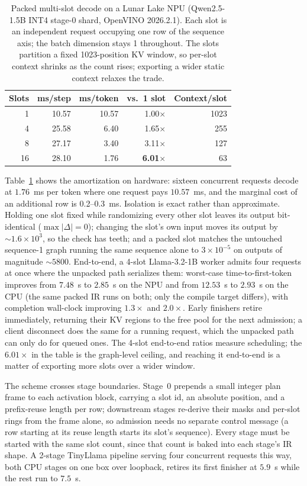 \documentclass[11pt]{article}
\begin{document}
\begin{table}[ht]
\centering
\caption{Packed multi-slot decode on a Lunar Lake NPU (Qwen2.5-1.5B INT4 stage-0 shard, OpenVINO 2026.2.1). Each slot is an independent request occupying one row of the sequence axis; the batch dimension stays 1 throughout. The slots partition a fixed 1023-position KV window, so per-slot context shrinks as the count rises; exporting a wider static context relaxes the trade.}
\label{tab:packed}
\begin{tabular}{@{}rrrrr@{}}
\toprule
Slots & ms/step & ms/token & vs.\ 1 slot & Context/slot \\
\midrule
1 & 10.57 & 10.57 & 1.00$\times$ & 1023 \\
4 & 25.58 & 6.40 & 1.65$\times$ & 255 \\
8 & 27.17 & 3.40 & 3.11$\times$ & 127 \\
16 & 28.10 & 1.76 & \textbf{6.01$\times$} & 63 \\
\bottomrule
\end{tabular}
\end{table}

Table~\ref{tab:packed} shows the amortization on hardware: sixteen concurrent requests decode at $1.76$~ms per token where one request pays $10.57$~ms, and the marginal cost of an additional row is 0.2--0.3~ms. Isolation is exact rather than approximate. Holding one slot fixed while randomizing every other slot leaves its output bit-identical ($\max|\Delta| = 0$); changing the slot's own input moves its output by ${\sim}1.6\times10^{3}$, so the check has teeth; and a packed slot matches the untouched sequence-1 graph running the same sequence alone to $3\times10^{-5}$ on outputs of magnitude ${\sim}5800$. End-to-end, a 4-slot Llama-3.2-1B worker admits four requests at once where the unpacked path serializes them: worst-case time-to-first-token improves from $7.48$~s to $2.85$~s on the NPU and from $12.53$~s to $2.93$~s on the CPU (the same packed IR runs on both; only the compile target differs), with completion wall-clock improving $1.3\times$ and $2.0\times$. Early finishers retire immediately, returning their KV regions to the free pool for the next admission; a client disconnect does the same for a running request, which the unpacked path can only do for queued ones. The 4-slot end-to-end ratios measure scheduling; the $6.01\times$ in the table is the graph-level ceiling, and reaching it end-to-end is a matter of exporting more slots over a wider window.

The scheme crosses stage boundaries. Stage~0 prepends a small integer plan frame to each activation block, carrying a slot id, an absolute position, and a prefix-reuse length per row; downstream stages re-derive their masks and per-slot rings from the frame alone, so admission needs no separate control message (a row starting at its reuse length starts its slot's sequence). Every stage must be started with the same slot count, since that count is baked into each stage's IR shape. A 2-stage TinyLlama pipeline serving four concurrent requests this way, both CPU stages on one box over loopback, retires its first finisher at $5.9$~s while the rest run to $7.5$~s.
\end{document}
